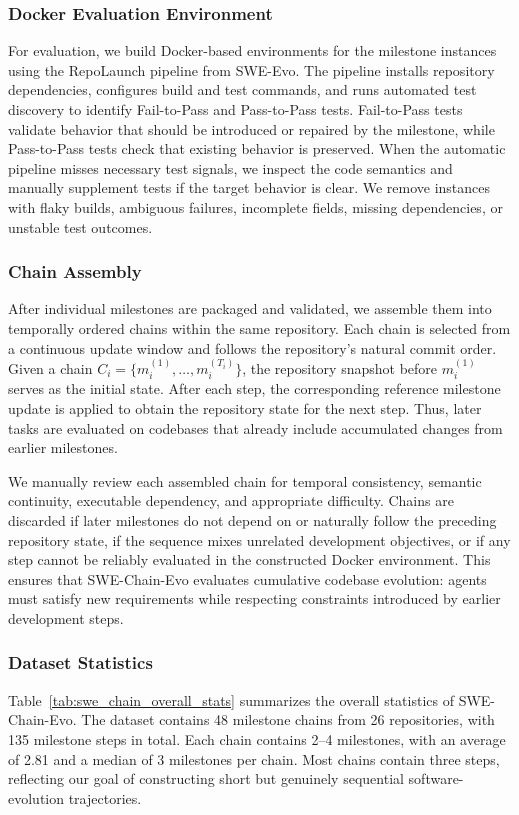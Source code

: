 \documentclass{llmxive}
\begin{document}
\subsubsection{Docker Evaluation Environment}
\label{app:swe_docker_evaluation}
For evaluation, we build Docker-based environments for the milestone instances using the RepoLaunch pipeline from SWE-Evo. The pipeline installs repository dependencies, configures build and test commands, and runs automated test discovery to identify Fail-to-Pass and Pass-to-Pass tests. Fail-to-Pass tests validate behavior that should be introduced or repaired by the milestone, while Pass-to-Pass tests check that existing behavior is preserved. When the automatic pipeline misses necessary test signals, we inspect the code semantics and manually supplement tests if the target behavior is clear. We remove instances with flaky builds, ambiguous failures, incomplete fields, missing dependencies, or unstable test outcomes.

\subsubsection{Chain Assembly}
\label{app:swe_chain_assembly}
After individual milestones are packaged and validated, we assemble them into temporally ordered chains within the same repository. Each chain is selected from a continuous update window and follows the repository's natural commit order. Given a chain \(C_i = \{m_i^{(1)}, \ldots, m_i^{(T_i)}\}\), the repository snapshot before \(m_i^{(1)}\) serves as the initial state. After each step, the corresponding reference milestone update is applied to obtain the repository state for the next step. Thus, later tasks are evaluated on codebases that already include accumulated changes from earlier milestones.

We manually review each assembled chain for temporal consistency, semantic continuity, executable dependency, and appropriate difficulty. Chains are discarded if later milestones do not depend on or naturally follow the preceding repository state, if the sequence mixes unrelated development objectives, or if any step cannot be reliably evaluated in the constructed Docker environment. This ensures that SWE-Chain-Evo evaluates cumulative codebase evolution: agents must satisfy new requirements while respecting constraints introduced by earlier development steps.

\subsubsection{Dataset Statistics}
\label{app:swe_dataset_statistics}
Table~\ref{tab:swe_chain_overall_stats} summarizes the overall statistics of SWE-Chain-Evo. The dataset contains 48 milestone chains from 26 repositories, with 135 milestone steps in total. Each chain contains 2--4 milestones, with an average of 2.81 and a median of 3 milestones per chain. Most chains contain three steps, reflecting our goal of constructing short but genuinely sequential software-evolution trajectories.
\end{document}
